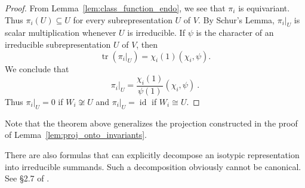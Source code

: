 \documentclass[12pt]{article}
\theoremstyle{plain}
\theoremstyle{definition}
\theoremstyle{remark}
\numberwithin{equation}{section}
\begin{document}
\begin{proof}
From Lemma~\ref{lem:class_function_endo}, we see that
$\pi_i$ is equivariant.
Thus $\pi_i(U) \subseteq U$ for every subrepresentation $U$ of $V$.
By Schur's Lemma, $\pi_i|_U$ is scalar multiplication whenever
$U$ is irreducible.
If $\psi$ is the character of an irreducible subrepresentation $U$ of $V$,
then
\[
\operatorname{tr}(\pi_i|_U)=\chi_i(1) ( \chi_i, \psi ) .
\]
We conclude that
\[
\pi_i|_U = \frac{\chi_i(1)}{\psi(1)} ( \chi_i, \psi ) \ .
\]
Thus $\pi_i|_U=0$ if $W_i \not\cong U$ and $\pi_i|_U=\operatorname{id}$
if $W_i \cong U$.
\end{proof}

Note that the theorem above generalizes the projection constructed in
the proof of Lemma~\ref{lem:proj_onto_invariants}.

There are also formulas that can explicitly decompose an
isotypic representation into irreducible summands.
Such a decomposition obviously cannot be canonical.
See \S 2.7 of \cite{Serre}.




\end{document}
